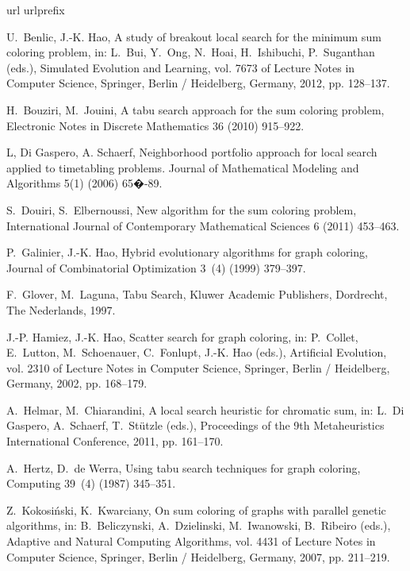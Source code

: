 \documentclass{elsart}
\begin{document}
\begin{thebibliography}{10}
\expandafter\ifx\csname url\endcsname\relax
  \def\url#1{\texttt{#1}}\fi
\expandafter\ifx\csname urlprefix\endcsname\relax\def\urlprefix{URL }\fi

U.~Benlic, J.-K. Hao, A study of breakout local search for the minimum sum
  coloring problem, in: L.~Bui, Y.~Ong, N.~Hoai, H.~Ishibuchi, P.~Suganthan
  (eds.), Simulated Evolution and Learning, vol. 7673 of Lecture Notes in
  Computer Science, Springer, Berlin / Heidelberg, Germany, 2012, pp. 128--137.

H.~Bouziri, M.~Jouini, A tabu search approach for the sum coloring problem,
  Electronic Notes in Discrete Mathematics 36 (2010) 915--922.

L, Di Gaspero, A. Schaerf, Neighborhood portfolio approach for local
search applied to timetabling problems. Journal of Mathematical Modeling
and Algorithms 5(1) (2006) 65�-89.

S.~Douiri, S.~Elbernoussi, New algorithm for the sum coloring problem,
  International Journal of Contemporary Mathematical Sciences 6 (2011)
  453--463.


P.~Galinier, J.-K. Hao, Hybrid evolutionary algorithms for graph coloring,
  Journal of Combinatorial Optimization 3~(4) (1999) 379--397.

F.~Glover, M.~Laguna, Tabu Search, Kluwer Academic Publishers, Dordrecht, The
  Nederlands, 1997.

J.-P. Hamiez, J.-K. Hao, Scatter search for graph coloring, in: P.~Collet,
  E.~Lutton, M.~Schoenauer, C.~Fonlupt, J.-K. Hao (eds.), Artificial Evolution,
  vol. 2310 of Lecture Notes in Computer Science, Springer, Berlin /
  Heidelberg, Germany, 2002, pp. 168--179.

A.~Helmar, M.~Chiarandini, A local search heuristic for chromatic sum, in:
  L.~{Di Gaspero}, A.~Schaerf, T.~St\"utzle (eds.), Proceedings of the 9th
  Metaheuristics International Conference, 2011, pp. 161--170.

A.~Hertz, D.~{de Werra}, Using tabu search techniques for graph coloring,
  Computing 39~(4) (1987) 345--351.

Z.~Kokosi\'{n}ski, K.~Kwarciany, On sum coloring of graphs with parallel
  genetic algorithms, in: B.~Beliczynski, A.~Dzielinski, M.~Iwanowski,
  B.~Ribeiro (eds.), Adaptive and Natural Computing Algorithms, vol. 4431 of
  Lecture Notes in Computer Science, Springer, Berlin / Heidelberg, Germany,
  2007, pp. 211--219.


\end{thebibliography}
\end{document}
